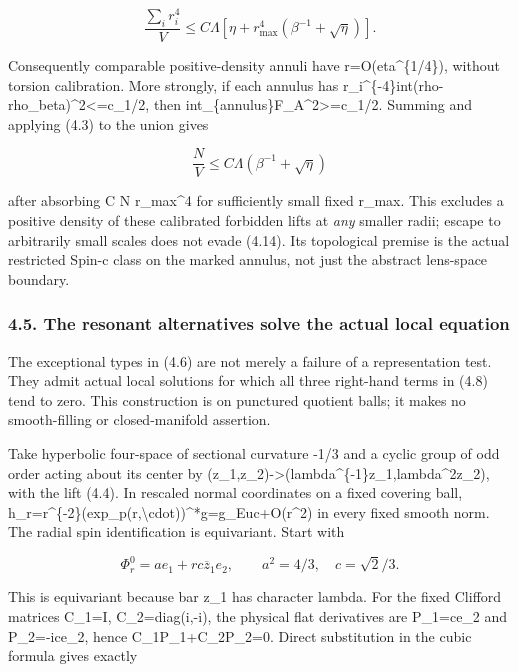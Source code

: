 \documentclass[
  10pt,
]{article}
\begin{document}
\[
 \frac{\sum_i r_i^4}V\le C\Lambda
            [\eta+r_{\max}^4(\beta^{-1}+\sqrt\eta)]. \tag{4.13}
\]

Consequently comparable positive-density annuli have
r=O(eta\^{}\{1/4\}), without torsion calibration. More strongly, if each
annulus has r\_i\^{}\{-4\}int(rho-rho\_beta)\^{}2\textless=c\_1/2, then
int\_\{annulus\}\textbar F\_A\textbar\^{}2\textgreater=c\_1/2. Summing
and applying (4.3) to the union gives

\[
 \boxed{\frac NV\le C\Lambda(\beta^{-1}+\sqrt\eta)}  \tag{4.14}
\]

after absorbing C N r\_max\^{}4 for sufficiently small fixed r\_max.
This excludes a positive density of these calibrated forbidden lifts at
\emph{any} smaller radii; escape to arbitrarily small scales does not
evade (4.14). Its topological premise is the actual restricted Spin-c
class on the marked annulus, not just the abstract lens-space boundary.

\hypertarget{the-resonant-alternatives-solve-the-actual-local-equation}{%
\subsubsection{4.5. The resonant alternatives solve the actual local
equation}\label{the-resonant-alternatives-solve-the-actual-local-equation}}

The exceptional types in (4.6) are not merely a failure of a
representation test. They admit actual local solutions for which all
three right-hand terms in (4.8) tend to zero. This construction is on
punctured quotient balls; it makes no smooth-filling or closed-manifold
assertion.

Take hyperbolic four-space of sectional curvature -1/3 and a cyclic
group of odd order acting about its center by
(z\_1,z\_2)-\textgreater(lambda\^{}\{-1\}z\_1,lambda\^{}2z\_2), with the
lift (4.4). In rescaled normal coordinates on a fixed covering ball,
h\_r=r\^{}\{-2\}(exp\_p(r,\textbackslash cdot))\^{}*g=g\_Euc+O(r\^{}2)
in every fixed smooth norm. The radial spin identification is
equivariant. Start with

\[
 \Phi_r^0=a e_1+r c\overline z_1e_2,\qquad
 a^2=4/3,\quad c=\sqrt2/3.                          \tag{4.15}
\]

This is equivariant because bar z\_1 has character lambda. For the fixed
Clifford matrices C\_1=I, C\_2=diag(i,-i), the physical flat derivatives
are P\_1=ce\_2 and P\_2=-ice\_2, hence C\_1P\_1+C\_2P\_2=0. Direct
substitution in the cubic formula gives exactly
\end{document}
